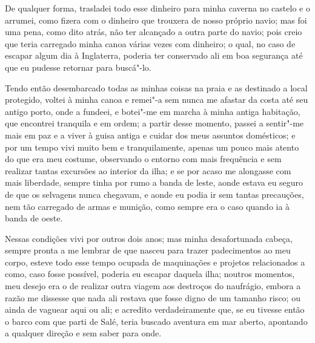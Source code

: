 De qualquer forma, trasladei todo esse dinheiro para minha caverna no
castelo e o arrumei, como fizera com o dinheiro que trouxera de nosso
próprio navio; mas foi uma pena, como dito atrás, não ter alcançado a
outra parte do navio; pois creio que teria carregado minha canoa várias
vezes com dinheiro; o qual, no caso de escapar algum dia à Inglaterra,
poderia ter conservado ali em boa segurança até que eu pudesse retornar
para buscá"-lo.

Tendo então desembarcado todas as minhas coisas na praia e as destinado
a local protegido, voltei à minha canoa e remei"-a sem nunca me afastar
da costa até seu antigo porto, onde a fundeei, e botei"-me em marcha à
minha antiga habitação, que encontrei tranquila e em ordem; a partir
desse momento, passei a sentir"-me mais em paz e a viver à guisa antiga e
cuidar dos meus assuntos domésticos; e por um tempo vivi muito bem e
tranquilamente, apenas um pouco mais atento do que era meu costume,
observando o entorno com mais frequência e sem realizar tantas excursões
ao interior da ilha; e se por acaso me alongasse com mais liberdade,
sempre tinha por rumo a banda de leste, aonde estava eu seguro de que os
selvagens nunca chegavam, e aonde eu podia ir sem tantas precauções, nem
tão carregado de armas e munição, como sempre era o caso quando ia à
banda de oeste.

Nessas condições vivi por outros dois anos; mas minha desafortunada
cabeça, sempre pronta a me lembrar de que nasceu para trazer
padecimentos ao meu corpo, esteve todo esse tempo ocupada de maquinações
e projetos relacionados a como, caso fosse possível, poderia eu escapar
daquela ilha; noutros momentos, meu desejo era o de realizar outra
viagem aos destroços do naufrágio, embora a razão me dissesse que nada
ali restava que fosse digno de um tamanho risco; ou ainda de vaguear
aqui ou ali; e acredito verdadeiramente que, se eu tivesse então o barco
com que parti de Salé, teria buscado aventura em mar aberto, apontando a
qualquer direção e sem saber para onde.

